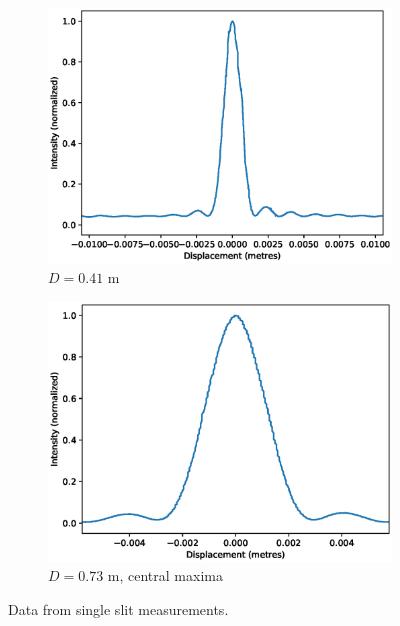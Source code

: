 \documentclass[11pt]{article}
\begin{document}
\begin{figure}[H]
\begin{subfigure}[b]{0.49\textwidth}
                \includegraphics[width=\textwidth]{Slit3.eps}
                \caption{$D = 0.41$ m}
        \end{subfigure}
        \begin{subfigure}[b]{0.49\textwidth}
                \includegraphics[width=\textwidth]{Slit2_detail.eps}
                \caption{$D = 0.73$ m, central maxima}
        \end{subfigure}
        \caption{Data from single slit measurements.}
        \label{fig:single}
        \end{figure}
\end{document}
